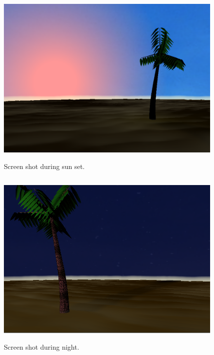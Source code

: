 \documentclass[annual]{acmsiggraph}
\begin{document}
\nocite{*}



\begin{figure}
\begin{center}
\includegraphics[width=500pt, height = 250pt]{fig1.png}
\caption{Screen shot during sun set.}
\end{center}
\end{figure}

\begin{figure}
\begin{center}
\includegraphics[width=500pt, height = 250pt]{fig2.png}
\caption{Screen shot during night.}
\end{center}
\end{figure}
\end{document}
